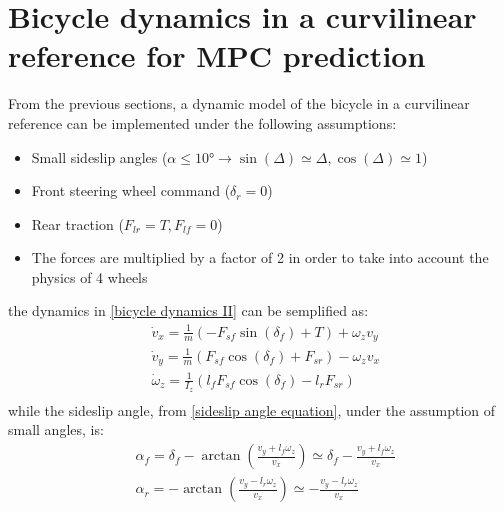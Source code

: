 \documentclass[12pt]{article}
\begin{document}
        \newpage


\section{Bicycle dynamics in a curvilinear reference for MPC prediction}
    From the previous sections, a dynamic model of the bicycle in a 
    curvilinear reference can be implemented under the following assumptions:
    \begin{itemize}
        \item Small sideslip angles ($\alpha \leq 10° \rightarrow \sin(\Delta) \simeq \Delta, \cos(\Delta) \simeq 1 $)
        \item Front steering wheel command ($\delta_r = 0$)
        \item Rear traction ($F_{lr} = T, F_{lf} = 0$)
        \item The forces are multiplied by a factor of 2 in order to take into account
        the physics of 4 wheels
    \end{itemize}
    the dynamics in \ref{bicycle dynamics II} can be semplified as:
    \begin{equation}
        \label{bicycle semplified dynamics}
        \begin{aligned}
            & \dot{v}_x = \frac{1}{m} (- F_{sf} \sin(\delta_f) + T) + \omega_z v_y  \\
            & \dot{v}_y = \frac{1}{m} (F_{sf} \cos(\delta_f) + F_{sr}) - \omega_z v_x  \\
            & \dot{\omega}_z = \frac{1}{I_z} (l_f F_{sf} \cos(\delta_f) - l_r F_{sr}) \\
        \end{aligned}
    \end{equation}
    while the sideslip angle, from \ref{sideslip angle equation}, under the assumption of
    small angles, is:
    \begin{equation}
        \begin{aligned}
            & \alpha_f = \delta_f - \arctan \left(\frac{v_y + l_f \omega_z}{v_x}\right) \simeq \delta_f - \frac{v_y + l_f \omega_z}{v_x}   \\ 
            & \alpha_r = - \arctan \left(\frac{v_y - l_r \omega_z}{v_x}\right) \simeq - \frac{v_y - l_r \omega_z}{v_x}  \\  
        \end{aligned}
    \end{equation}
\end{document}
